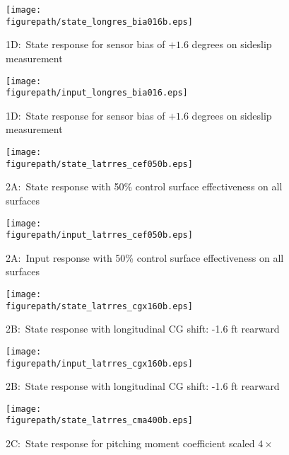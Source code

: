 \begin{figure}[H]
  \begin{center}
    \texttt{[image: \\figurepath/state\_longres\_bia016b.eps]}
    \caption{1D:\ State response for sensor bias of $+1.6$ degrees on sideslip measurement}
  \end{center}
\end{figure}

\begin{figure}[H]
  \begin{center}
    \texttt{[image: \\figurepath/input\_longres\_bia016.eps]}
    \caption{1D:\ State response for sensor bias of $+1.6$ degrees on sideslip measurement}
  \end{center}
\end{figure}

\begin{figure}[H]
  \begin{center}
    \texttt{[image: \\figurepath/state\_latrres\_cef050b.eps]}
    \caption{2A:\ State response with 50\% control surface effectiveness on all surfaces}
  \end{center}
\end{figure}

\begin{figure}[H]
  \begin{center}
    \texttt{[image: \\figurepath/input\_latrres\_cef050b.eps]}
    \caption{2A:\ Input response with 50\% control surface effectiveness on all surfaces}
  \end{center}
\end{figure}

\begin{figure}[H]
  \begin{center}
    \texttt{[image: \\figurepath/state\_latrres\_cgx160b.eps]}
    \caption{2B:\ State response with longitudinal CG shift: -1.6 ft rearward}
  \end{center}
\end{figure}

\begin{figure}[H]
  \begin{center}
    \texttt{[image: \\figurepath/input\_latrres\_cgx160b.eps]}
    \caption{2B:\ State response with longitudinal CG shift: -1.6 ft rearward}
  \end{center}
\end{figure}

\begin{figure}[H]
  \begin{center}
    \texttt{[image: \\figurepath/state\_latrres\_cma400b.eps]}
    \caption{2C:\ State response for pitching moment coefficient scaled $4\times$}
  \end{center}
\end{figure}

